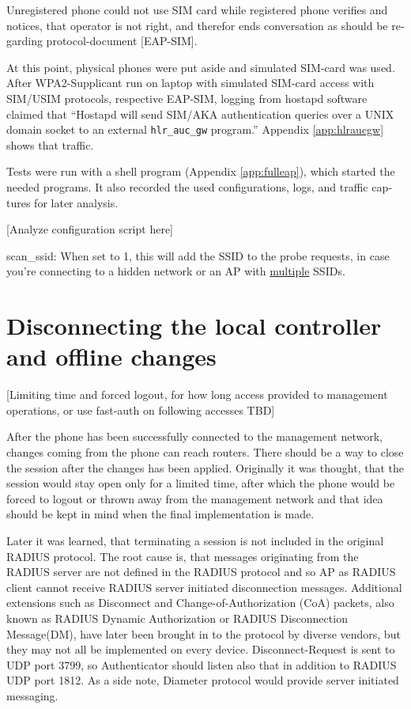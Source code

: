 \documentclass[12pt,a4paper,english]{tutthesis}
\begin{document}
\begin{otherlanguage}{english}
Unregistered phone could not use SIM card while 
registered phone verifies and notices, that operator is not right, 
and therefor ends conversation as should be regarding protocol-document [EAP-SIM].

At this point, physical phones were put aside and simulated SIM-card
was used.
After WPA2-Supplicant run on laptop with simulated SIM-card access 
with SIM/USIM protocols, respective EAP-SIM, logging 
from hostapd software claimed that ``Hostapd will send SIM/AKA authentication
queries over a UNIX domain socket to an external \verb~hlr_auc_gw~ program.''
Appendix \ref{app:hlraucgw}   shows that traffic.

Tests were run with a shell program (Appendix \ref{app:fulleap}), which
started the needed programs. It also recorded the used configurations, logs,
and traffic captures for later analysis.

[Analyze configuration script here]

scan\_ssid: When set to 1, this will add the SSID to the probe
requests, in case you're connecting to a hidden network or an AP with
\uline{multiple} SSIDs.

\section{Disconnecting the local controller and offline changes}
\label{sec-5-3}
\label{sec:disconnections}
[Limiting time and forced logout, for how long access provided to
management operations, or use fast-auth on following accesses TBD]

After the phone has been successfully connected to the management network,
changes coming from 
the phone can reach routers.  There should be a way to close the session after
the changes has been applied. Originally it was thought, that the session
would stay open only for a limited time, after which the phone would be forced to
logout or thrown away from the management network and that idea should be
kept in mind when the final implementation is made.





Later it was learned, that terminating a session is not included in the original RADIUS protocol.
The root cause is, that messages originating from the RADIUS server
are not defined in the RADIUS protocol and so AP as RADIUS client cannot
receive RADIUS server initiated disconnection messages. 
Additional
extensions such as Disconnect and Change-of-Authorization (CoA)
packets, also known as RADIUS Dynamic Authorization or RADIUS
Disconnection Message(DM), have later been brought in\cite{rfc5176}
to the protocol by diverse vendors, but they may not all be implemented on
every device.
Disconnect-Request is sent to UDP port 3799, so Authenticator should
listen also that in addition to RADIUS UDP port 1812.
As a side note, Diameter protocol would provide server initiated messaging.













\end{otherlanguage}
\end{document}
